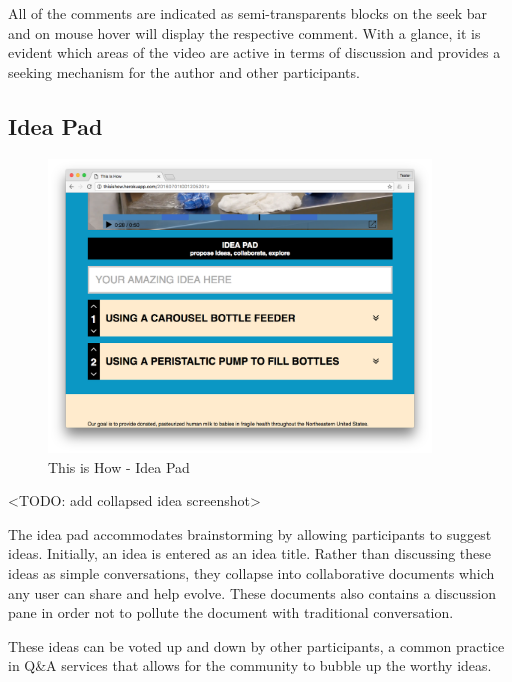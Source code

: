 
All of the comments are indicated as semi-transparents blocks on the seek bar and on mouse hover will display the respective comment. With a glance, it is evident which areas of the video are active in terms of discussion and provides a seeking mechanism for the author and other participants.  
\subsection{Idea Pad}

   \begin{figure}[thpb]
      \centering
      \includegraphics[width=4in]{figures/ideapad.png}
      \caption{This is How - Idea Pad}
      \label{fig_comment_thread}
   \end{figure}

<TODO: add collapsed idea screenshot> 

The idea pad accommodates brainstorming by allowing participants to suggest ideas. Initially, an idea is entered as an idea title. Rather than discussing these ideas as simple conversations, they collapse into collaborative documents which any user can share and help evolve. These documents also contains a discussion pane in order not to pollute the document with traditional conversation. 

These ideas can be voted up and down by other participants, a common practice in Q\&A services\cite{stackoverflow}\cite{quora} that allows for the community to bubble up the worthy ideas.   
